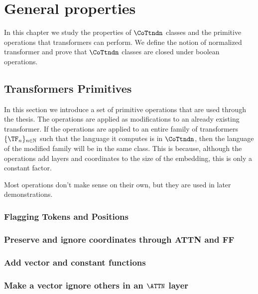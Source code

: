 \chapter{General properties}

In this chapter we study the properties of $\CoTtndn$ classes and the primitive operations that transformers can perform.
We define the notion of normalized transformer and prove that $\CoTtndn$ classes are closed  under boolean operations.


\section{Transformers Primitives}

In this section we introduce a set of primitive operations that are used through the thesis.
The operations are applied as modifications to an already existing transformer.
If the operations are applied to an entire family of transformers $\{\TF_n\}_{n \in \mathbb{N}}$ such that the language it computes is in $\CoTtndn$, then the language of the modified family will be in the same class.
This is because, although the operations add layers and coordinates to the size of the embedding, this is only a constant factor.

Most operations don't make sense on their own, but they are used in later demonstrations.


\subsection{Flagging Tokens and Positions}



\subsection{Preserve and ignore coordinates through ATTN and FF}



\subsection{Add vector and constant functions}\label{const-fun}



\subsection{Make a vector ignore others in an $\ATTN$ layer}\label{ignore-vecs}

